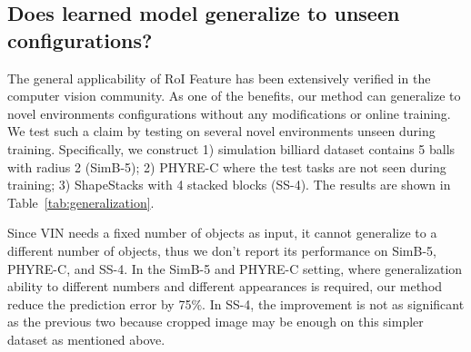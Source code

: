 \documentclass{article} \usepackage{iclr2021_conference,times}
\begin{document}
\vspace{-0.5em}
\subsection{Does learned model generalize to unseen configurations?}
\vspace{-0.5em}

\begin{table}[t]
\centering
\setlength{\tabcolsep}{3pt}
\renewcommand{\arraystretch}{1.37}
\caption{The ability to generalize to novel environments. We show the average prediction error for $t\in [0, 2\times T_{\rm train}]$. Our method achieves significantly better results compared to previous methods. The error is scaled by 1,000. Our method generalizes much better than other baselines.}
\label{tab:generalization}
\vspace{-1.0em}
\end{table}

The general applicability of RoI Feature has been extensively verified in the computer vision community. As one of the benefits, our method can generalize to novel environments configurations without any modifications or online training. We test such a claim by testing on several novel environments unseen during training. Specifically, we construct 1) simulation billiard dataset contains 5 balls with radius 2 (SimB-5); 2) PHYRE-C where the test tasks are not seen during training; 3) ShapeStacks with 4 stacked blocks (SS-4). The results are shown in Table~\ref{tab:generalization}.

Since VIN needs a fixed number of objects as input, it cannot generalize to a different number of objects, thus we don't report its performance on SimB-5, PHYRE-C, and SS-4. In the SimB-5 and PHYRE-C setting, where generalization ability to different numbers and different appearances is required, our method reduce the prediction error by 75\%. In SS-4, the improvement is not as significant as the previous two because cropped image may be enough on this simpler dataset as mentioned above.
\end{document}
